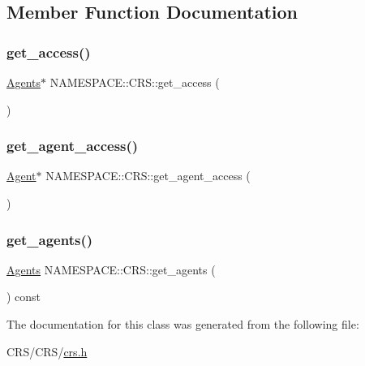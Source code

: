 \subsection{Member Function Documentation}
\mbox{\label{class_n_a_m_e_s_p_a_c_e_1_1_c_r_s_ae352638954df2684ae3e080e99bb3d1b}} 
\subsubsection{\texorpdfstring{get\+\_\+access()}{get\_access()}}
{\footnotesize\ttfamily \hyperlink{namespace_n_a_m_e_s_p_a_c_e_a610552ba0110b3ee573bc9f3a7a8eac4}{Agents}$\ast$ N\+A\+M\+E\+S\+P\+A\+C\+E\+::\+C\+R\+S\+::get\+\_\+access (\begin{DoxyParamCaption}{ }\end{DoxyParamCaption})}

\mbox{\label{class_n_a_m_e_s_p_a_c_e_1_1_c_r_s_a1835af2e509fb495de3e5eb515fbd5cd}} 
\subsubsection{\texorpdfstring{get\+\_\+agent\+\_\+access()}{get\_agent\_access()}}
{\footnotesize\ttfamily \hyperlink{class_n_a_m_e_s_p_a_c_e_1_1_agent}{Agent}$\ast$ N\+A\+M\+E\+S\+P\+A\+C\+E\+::\+C\+R\+S\+::get\+\_\+agent\+\_\+access (\begin{DoxyParamCaption}{ }\end{DoxyParamCaption})}

\mbox{\label{class_n_a_m_e_s_p_a_c_e_1_1_c_r_s_ae81748dc264ab0f110a747fa78d9f570}} 
\subsubsection{\texorpdfstring{get\+\_\+agents()}{get\_agents()}}
{\footnotesize\ttfamily \hyperlink{namespace_n_a_m_e_s_p_a_c_e_a610552ba0110b3ee573bc9f3a7a8eac4}{Agents} N\+A\+M\+E\+S\+P\+A\+C\+E\+::\+C\+R\+S\+::get\+\_\+agents (\begin{DoxyParamCaption}{ }\end{DoxyParamCaption}) const}



The documentation for this class was generated from the following file\+:\begin{DoxyCompactItemize}
\item 
C\+R\+S/\+C\+R\+S/\hyperlink{crs_8h}{crs.\+h}\end{DoxyCompactItemize}
